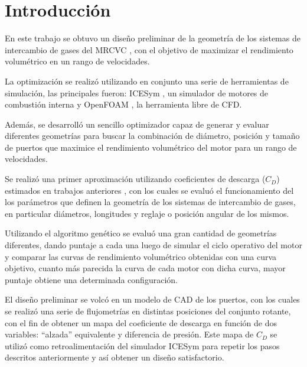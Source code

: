 \chapter{Introducción}

En este trabajo se obtuvo un diseño preliminar de la geometría de los  sistemas
de intercambio de gases del MRCVC \cite{toth}, con el objetivo de
maximizar el rendimiento volumétrico en un rango de velocidades.

La optimización se realizó utilizando en conjunto una serie de herramientas de
simulación, las principales fueron: ICESym \cite{icesym}, un simulador de
motores de combustión interna y OpenFOAM \cite{openfoam}, la herramienta libre
de CFD.

Además, se desarrolló un sencillo optimizador capaz de generar y evaluar
diferentes geometrías para buscar la combinación de diámetro, posición y tamaño
de puertos que maximice el rendimiento volumétrico del motor para un rango de
velocidades.


Se realizó una primer aproximación utilizando coeficientes de descarga ($C_{D}$)
estimados en trabajos anteriores \cite{lopez13}, con los cuales se evaluó el
funcionamiento del los parámetros que definen la geometría de los sistemas de
intercambio de gases, en particular diámetros, longitudes y reglaje o posición
angular de los mismos.

Utilizando el algoritmo genético se evaluó una gran cantidad de geometrías
diferentes, dando puntaje a cada una luego de simular el ciclo operativo del
motor y comparar las curvas de rendimiento volumétrico obtenidas con una curva
objetivo, cuanto más parecida la curva de cada motor con dicha curva, mayor
puntaje obtiene una determinada configuración.


El diseño preliminar se volcó en un modelo de CAD de los puertos, con los cuales
se realizó una serie de flujometrías en distintas posiciones del conjunto
rotante, con el fin de obtener un mapa del coeficiente de descarga en
función de dos variables: ``alzada'' equivalente y diferencia de presión.
%
Este mapa de $C_{D}$ se utilizó como retroalimentación del simulador ICESym
para repetir los pasos descritos anteriormente y así obtener un diseño
satisfactorio.

